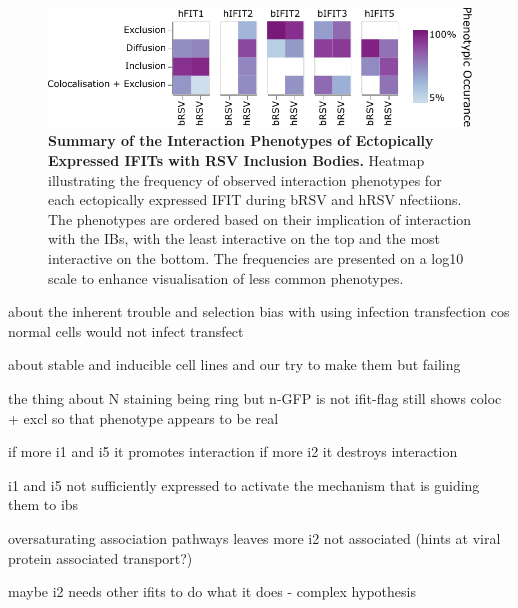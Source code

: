 \begin{figure}
    \centering
    \includegraphics[width=1\linewidth]{09. Chapter 4/Figs/heatmap-infection-transfection.pdf}
    \caption[Summary of the Interaction Phenotypes of Ectopically Expressed IFITs with RSV Inclusion Bodies.]{\textbf{Summary of the Interaction Phenotypes of Ectopically Expressed IFITs with RSV Inclusion Bodies.} Heatmap illustrating the frequency of observed interaction phenotypes for each ectopically expressed IFIT during bRSV and hRSV nfectiions. The phenotypes are ordered based on their implication of interaction with the IBs, with the least interactive on the top and the most interactive on the bottom. The frequencies are presented on a log10 scale to enhance visualisation of less common phenotypes.}
    \label{fig:Summary of the Interaction Phenotypes of Ectopically Expressed IFITs with RSV Inclusion Bodies}
\end{figure}






about the inherent trouble and selection bias with using infection transfection cos normal cells would not infect transfect

about stable and inducible cell lines and our try to make them but failing






the thing about N staining being ring but n-GFP is not
ifit-flag still shows coloc + excl so that phenotype appears to be real




if more i1 and i5 it promotes interaction
if more i2 it destroys interaction


i1 and i5 not sufficiently expressed to activate the mechanism that is guiding them to ibs

oversaturating association pathways leaves more i2 not associated (hints at viral protein associated transport?)

maybe i2 needs other ifits to do what it does - complex hypothesis





